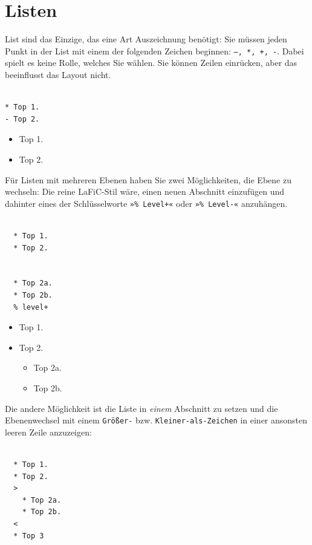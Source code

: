 \documentclass{scrartcl}
\begin{document}
\section{Listen}

{List sind das Einzige, das eine Art Auszeichnung benötigt:
Sie müssen jeden Punkt in der List mit einem der folgenden
Zeichen beginnen: \texttt{–, *, +, -}. Dabei spielt es keine Rolle,
welches Sie wählen. Sie können Zeilen einrücken, aber das
beeinflusst das Layout nicht.\\}

\begin{verbatim}

* Top 1.
- Top 2.
\end{verbatim}


\begin{itemize}
\item Top 1.
\item Top 2.
\end{itemize}


{Für Listen mit mehreren Ebenen haben Sie zwei Möglichkeiten,
die Ebene zu wechseln: Die reine LaFiC-Stil wäre, einen
neuen Abschnitt einzufügen und dahinter eines der
Schlüsselworte \texttt{»\% Level+«} oder \texttt{»\% Level-«} anzuhängen.\\}

\begin{verbatim}

  * Top 1.
  * Top 2.


  * Top 2a.
  * Top 2b.
  % level+
\end{verbatim}


\begin{itemize}
\item Top 1.
\item Top 2.

\begin{itemize}
\item Top 2a.
\item Top 2b.
\end{itemize}

\end{itemize}


{Die andere Möglichkeit ist die Liste in \emph{einem} Abschnitt zu
setzen und die Ebenenwechsel mit einem \texttt{Größer-}
bzw. \texttt{Kleiner-als-Zeichen} in einer ansonsten leeren Zeile anzuzeigen:\\}

\begin{verbatim}

  * Top 1.
  * Top 2.
  >
    * Top 2a.
    * Top 2b.
  <
  * Top 3
\end{verbatim}
\end{document}
